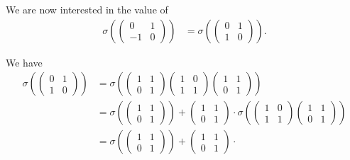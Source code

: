 We are now interested in the value of
\begin{align*}
\sigma\left(
	\left(\begin{matrix} 0 & 1 \\ -1 & 0 \end{matrix}\right)
\right) &=
\sigma\left(
	\left(\begin{matrix} 0 & 1 \\ 1 & 0 \end{matrix}\right)
\right).
\end{align*}

We have
\begin{align*}
\sigma\left(
	\left(\begin{matrix} 0 & 1 \\ 1 & 0 \end{matrix}\right)
\right) &=
\sigma\left(
	\left(\begin{matrix} 1 & 1 \\ 0 & 1 \end{matrix}\right)
	\left(\begin{matrix} 1 & 0 \\ 1 & 1 \end{matrix}\right)
	\left(\begin{matrix} 1 & 1 \\ 0 & 1 \end{matrix}\right)
\right) \\
&=
\sigma\left(
	\left(\begin{matrix} 1 & 1 \\ 0 & 1 \end{matrix}\right)
\right) +
\left(\begin{matrix} 1 & 1 \\ 0 & 1 \end{matrix}\right) \cdot
\sigma\left(
	\left(\begin{matrix} 1 & 0 \\ 1 & 1 \end{matrix}\right)
	\left(\begin{matrix} 1 & 1 \\ 0 & 1 \end{matrix}\right)
\right) \\ 
&=
\sigma\left(
	\left(\begin{matrix} 1 & 1 \\ 0 & 1 \end{matrix}\right)
\right) +
\left(\begin{matrix} 1 & 1 \\ 0 & 1 \end{matrix}\right) \cdot

\end{align*}
